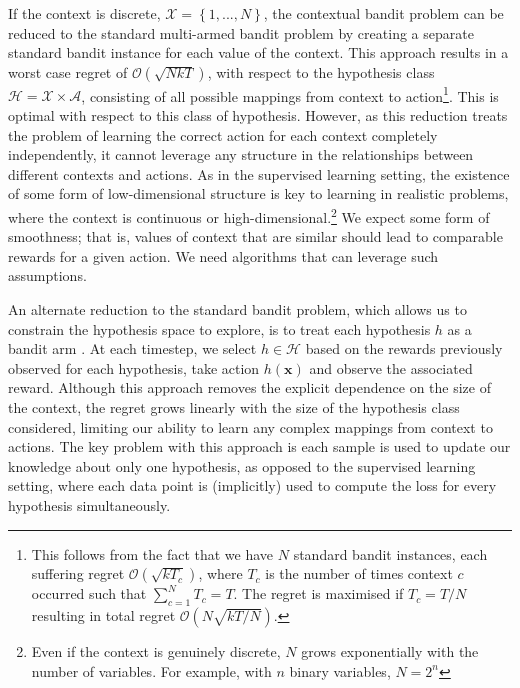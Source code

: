 \documentclass[11pt,a4paper,twoside]{report}
\newcommand{\actionspace}{\mathcal{A}}
\newcommand{\set}[1]{\left\{#1\right\}}
\newcommand{\bigo}[1]{\mathcal{O}\left( #1 \right)}
\renewcommand{\vec}[1]{\boldsymbol{#1}}
\theoremstyle{plain}
\theoremstyle{definition}
\begin{document}
If the context is discrete, $\mathcal{X} = \set{1,...,N}$, the contextual bandit problem can be reduced to the standard multi-armed bandit problem by creating a separate standard bandit instance for each value of the context. This approach results in a worst case regret of $\bigo{\sqrt{NkT}}$, with respect to the hypothesis class $\mathcal{H} = \mathcal{X} \times \actionspace$, consisting of all possible mappings from context to action\footnote{This follows from the fact that we have $N$ standard bandit instances, each suffering regret $\bigo{\sqrt{kT_c}}$, where $T_c$ is the number of times context $c$ occurred such that $\sum_{c=1}^N T_c = T$. The regret is maximised if $T_c = T/N$ resulting in total regret $\bigo{N\sqrt{kT/N}}$.}. This is optimal with respect to this class of hypothesis. However, as this reduction treats the problem of learning the correct action for each context completely independently, it cannot leverage any structure in the relationships between different contexts and actions. As in the supervised learning setting, the existence of some form of low-dimensional structure is key to learning in realistic problems, where the context is continuous or high-dimensional.\footnote{Even if the context is genuinely discrete, $N$ grows exponentially with the number of variables. For example, with $n$ binary variables, $N = 2^n$} We expect some form of smoothness; that is, values of context that are similar should lead to comparable rewards for a given action. We need algorithms that can leverage such assumptions. 

An alternate reduction to the standard bandit problem, which allows us to constrain the hypothesis space to explore, is to treat each hypothesis $h$ as a bandit arm \citep{Langford2008}. At each timestep, we select $h \in \mathcal{H}$ based on the rewards previously observed for each hypothesis, take action $h(\vec{x})$ and observe the associated reward. Although this approach removes the explicit dependence on the size of the context, the regret  grows linearly with the size of the hypothesis class considered, limiting our ability to learn any complex mappings from context to actions. The key problem with this approach is each sample is used to update our knowledge about only one hypothesis, as opposed to the supervised learning setting, where each data point is (implicitly) used to compute the loss for every hypothesis simultaneously. 
\end{document}

